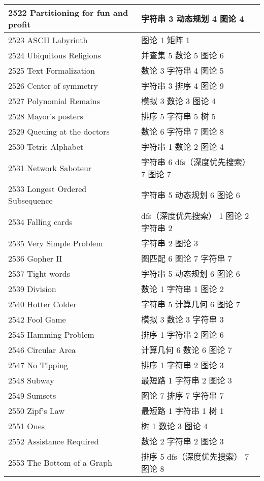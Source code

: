 \begin{longtable}{| p{} | p{} |}
 2522 Partitioning for fun and profit  & 字符串 3 动态规划 4 图论 4 \\ \hline
 2523 ASCII Labyrinth  & 图论 1 矩阵 1 \\ \hline
 2524 Ubiquitous Religions  & 并查集 5 数论 5 图论 6 \\ \hline
 2525 Text Formalization  & 数论 3 字符串 4 图论 5 \\ \hline
 2526 Center of symmetry  & 字符串 3 排序 4 图论 9 \\ \hline
 2527 Polynomial Remains  & 模拟 3 数论 3 图论 4 \\ \hline
 2528 Mayor's posters  & 排序 5 字符串 5 树 5 \\ \hline
 2529 Queuing at the doctors  & 数论 6 字符串 7 图论 8 \\ \hline
 2530 Tetris Alphabet  & 字符串 1 数论 2 图论 4 \\ \hline
 2531 Network Saboteur  & 字符串 6 dfs（深度优先搜索） 7 图论 7 \\ \hline
 2533 Longest Ordered Subsequence  & 字符串 5 动态规划 6 图论 6 \\ \hline
 2534 Falling cards  & dfs（深度优先搜索） 1 图论 2 字符串 2 \\ \hline
 2535 Very Simple Problem  & 字符串 2 图论 3 \\ \hline
 2536 Gopher II  & 图匹配 6 图论 7 字符串 7 \\ \hline
 2537 Tight words  & 字符串 5 动态规划 6 图论 6 \\ \hline
 2539 Division  & 数论 1 字符串 1 图论 2 \\ \hline
 2540 Hotter Colder  & 字符串 5 计算几何 6 图论 7 \\ \hline
 2542 Fool Game  & 模拟 3 数论 3 字符串 3 \\ \hline
 2545 Hamming Problem  & 排序 1 字符串 2 图论 6 \\ \hline
 2546 Circular Area  & 计算几何 6 数论 6 图论 7 \\ \hline
 2547 No Tipping  & 排序 1 字符串 2 图论 3 \\ \hline
 2548 Subway  & 最短路 1 字符串 2 图论 3 \\ \hline
 2549 Sumsets  & 图论 7 排序 7 字符串 7 \\ \hline
 2550 Zipf's Law  & 最短路 1 字符串 1 树 1 \\ \hline
 2551 Ones  & 树 1 数论 3 图论 4 \\ \hline
 2552 Assistance Required  & 数论 2 字符串 2 图论 3 \\ \hline
 2553 The Bottom of a Graph  & 排序 5 dfs（深度优先搜索） 7 图论 8 \\ \hline

\end{longtable}
